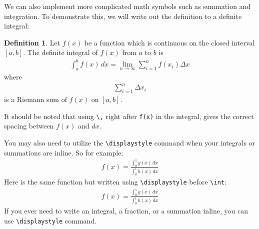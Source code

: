 \documentclass[]{article}%
\newcommand{\bs}{\textbackslash}
\newcommand{\TT}[1]{\texttt{#1}}
\theoremstyle{definition}
\newtheorem{dfn}{Definition}
\begin{document}
	We can also implement more complicated math symbols such as summation and integration.
	To demonstrate this, we will write out the definition to a definite integral:
	\begin{dfn}
		Let $f(x)$ be a function which is continuous on the closed interval $[a,b]$. The definite integral of $f(x)$ from $a$ to $b$ is
		\begin{align*}
			\int_a^b f(x)\,dx = \lim_{n\rightarrow \infty} \sum_{i=1}^n f(x_i) \Delta x 
		\end{align*}
		where
		\begin{align*}
			\sum_{i=1}^n \Delta x_i 
		\end{align*}
		is a Riemann sum of $f(x)$ on $[a,b]$.
	\end{dfn}
	\noindent It should be noted that using \TT{\bs,} right after \TT{f(x)} in the integral, gives the correct spacing between $f(x)$ and $dx$.
	
	You may also need to utilize the \TT{\bs displaystyle} command when your integrals or summations are inline. So for example:
	\begin{align}
		f(x) = \frac{\int_0^1g(x)\,dx}{\int_0^1h(x)\,dx}
	\end{align}
	Here is the same function but written using \TT{\bs displaystyle} before \TT{\bs int}:
	\begin{align}
		f(x) = \frac{\displaystyle\int_0^1g(x)\,dx}{\displaystyle\int_0^1h(x)\,dx}
	\end{align}
	If you ever need to write an integral, a fraction, or a summation inline, you can use \TT{\bs displaystyle} command.
	
\end{document}
